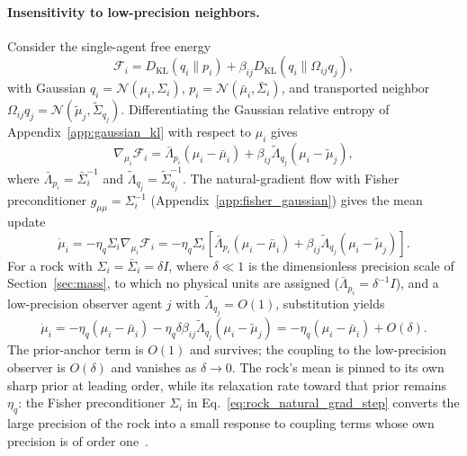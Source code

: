 \documentclass[11pt]{article}
\begin{document}
\paragraph{Insensitivity to low-precision neighbors.} Consider the single-agent free energy
\begin{equation}
\mathcal{F}_i = D_{\mathrm{KL}}(q_i \| p_i) + \beta_{ij} D_{\mathrm{KL}}(q_i \| \Omega_{ij} q_j),
\end{equation}
with Gaussian $q_i = \mathcal{N}(\mu_i, \Sigma_i)$, $p_i = \mathcal{N}(\bar{\mu}_i, \bar{\Sigma}_i)$, and transported neighbor $\Omega_{ij} q_j = \mathcal{N}(\tilde{\mu}_j, \tilde{\Sigma}_{q_j})$. Differentiating the Gaussian relative entropy of Appendix~\ref{app:gaussian_kl} with respect to $\mu_i$ gives
\begin{equation}
\nabla_{\mu_i}\mathcal{F}_i = \bar{\Lambda}_{p_i}(\mu_i - \bar{\mu}_i) + \beta_{ij}\tilde{\Lambda}_{q_j}(\mu_i - \tilde{\mu}_j),
\label{eq:rock_grad_mu}
\end{equation}
where $\bar{\Lambda}_{p_i} = \bar{\Sigma}_i^{-1}$ and $\tilde{\Lambda}_{q_j} = \tilde{\Sigma}_{q_j}^{-1}$. The natural-gradient flow with Fisher preconditioner $g_{\mu\mu} = \Sigma_i^{-1}$ (Appendix~\ref{app:fisher_gaussian}) gives the mean update
\begin{equation}
\dot{\mu}_i = -\eta_q \Sigma_i \nabla_{\mu_i}\mathcal{F}_i = -\eta_q\Sigma_i\left[\bar{\Lambda}_{p_i}(\mu_i - \bar{\mu}_i) + \beta_{ij}\tilde{\Lambda}_{q_j}(\mu_i - \tilde{\mu}_j)\right].
\label{eq:rock_natural_grad_step}
\end{equation}
For a rock with $\Sigma_i = \bar{\Sigma}_i = \delta I$, where $\delta \ll 1$ is the dimensionless precision scale of Section~\ref{sec:mass}, to which no physical units are assigned ($\bar{\Lambda}_{p_i} = \delta^{-1} I$), and a low-precision observer agent $j$ with $\tilde{\Lambda}_{q_j} = O(1)$, substitution yields
\begin{equation}
\dot{\mu}_i = -\eta_q(\mu_i - \bar{\mu}_i) - \eta_q \delta \beta_{ij} \tilde{\Lambda}_{q_j} (\mu_i - \tilde{\mu}_j) = -\eta_q(\mu_i - \bar{\mu}_i) + O(\delta).
\label{eq:rock_inertia}
\end{equation}
The prior-anchor term is $O(1)$ and survives; the coupling to the low-precision observer is $O(\delta)$ and vanishes as $\delta \to 0$. The rock's mean is pinned to its own sharp prior at leading order, while its relaxation rate toward that prior remains $\eta_q$: the Fisher preconditioner $\Sigma_i$ in Eq.~\eqref{eq:rock_natural_grad_step} converts the large precision of the rock into a small response to coupling terms whose own precision is of order one~\cite{Amari2016}.
\end{document}
